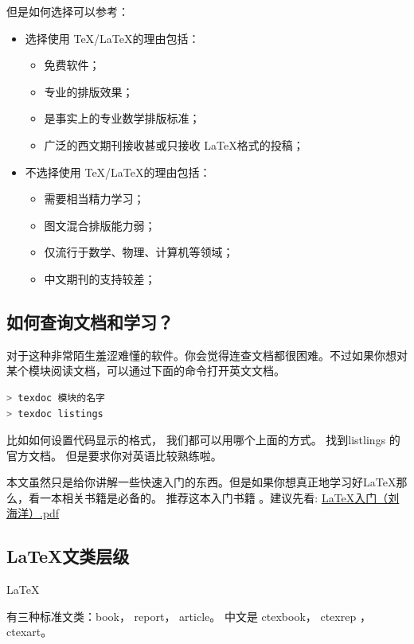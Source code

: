 \documentclass[UTF8,AutoFakeBold]{ctexart}
\numberwithin{figure}{section}
\numberwithin{table}{section}
\begin{document}
但是如何选择可以参考：
\begin{itemize}
    \item \Checkmark 选择使用 \TeX /\LaTeX 的理由包括：

          \begin{itemize}
              \item 免费软件；
              \item 专业的排版效果；
              \item 是事实上的专业数学排版标准；
              \item 广泛的西文期刊接收甚或只接收 \LaTeX 格式的投稿；
          \end{itemize}

    \item \Checkmark 不选择使用 \TeX/\LaTeX 的理由包括：
          \begin{itemize}
              \item 需要相当精力学习；
              \item 图文混合排版能力弱；
              \item 仅流行于数学、物理、计算机等领域；
              \item 中文期刊的支持较差；
          \end{itemize}
\end{itemize}

\subsection{如何查询文档和学习？}
对于这种非常陌生羞涩难懂的软件。你会觉得连查文档都很困难。不过如果你想对某个模块阅读文档，可以通过下面的命令打开英文文档。

\begin{lstlisting}[language=bash]
> texdoc 模块的名字
> texdoc listings
\end{lstlisting}

比如如何设置代码显示的格式， 我们都可以用哪个上面的方式。 找到listlings 的官方文档。 但是要求你对英语比较熟练啦。


本文虽然只是给你讲解一些快速入门的东西。但是如果你想真正地学习好\LaTeX 那么，看一本相关书籍是必备的。
推荐这本入门书籍\cite{latex_start} 。建议先看: \href{https://github.com/heartacker/MyNotes/blob/master/01.Latex/LaTeX_Docs_2014/04%20%E7%94%B5%E5%AD%90%E4%B9%A6/LaTeX%E5%85%A5%E9%97%A8%EF%BC%88%E5%88%98%E6%B5%B7%E6%B4%8B%EF%BC%89.pdf}{LaTeX入门（刘海洋）.pdf}


\subsection{\LaTeX 文类层级}
\label{sec:structure}
\hypertarget{Levelofdepth}{\LaTeX} 有三种标准文类：book， report， article。 中文是 ctexbook， ctexrep ， ctexart。
\end{document}
